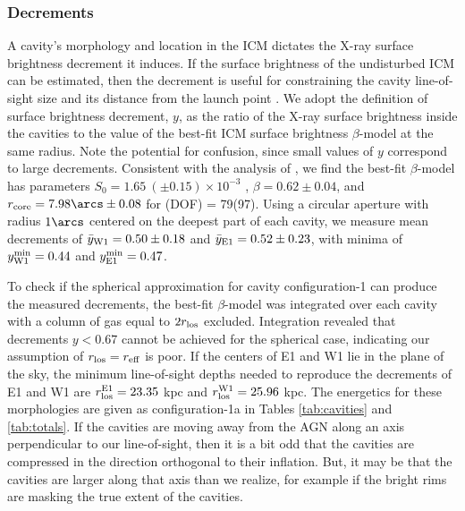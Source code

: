 \documentclass[11pt, preprint]{aastex}
\begin{document}
\subsubsection{Decrements}
\label{sec:dec}

A cavity's morphology and location in the ICM dictates the X-ray
surface brightness decrement it induces. If the surface brightness of
the undisturbed ICM can be estimated, then the decrement is useful for
constraining the cavity line-of-sight size and its distance from the
launch point \citep[\ie\ \rlos\ and $z$, respectively; see][for
  details]{hydraa}. We adopt the \citet{hydraa} definition of surface
brightness decrement, $y$, as the ratio of the X-ray surface
brightness inside the cavities to the value of the best-fit ICM
surface brightness $\beta$-model at the same radius. Note the
potential for confusion, since small values of $y$ correspond to large
decrements. Consistent with the analysis of \citet{schindler01}, we
find the best-fit $\beta$-model has parameters $S_0 = 1.65 ~(\pm 0.15)
\times 10^{-3}$ \sbr, $\beta = 0.62 \pm 0.04$, and $r_{\rm{core}} =
7.98\arcs \pm 0.08$ for \chisq(DOF) = 79(97). Using a circular
aperture with radius $1\arcs$ centered on the deepest part of each
cavity, we measure mean decrements of $\bar{y}_{\rm{W1}} = 0.50 \pm
0.18$ and $\bar{y}_{\rm{E1}} = 0.52 \pm 0.23$, with minima of
$y^{\rm{min}}_{\rm{W1}} = 0.44$ and $y^{\rm{min}}_{\rm{E1}} = 0.47$.

To check if the spherical approximation for cavity configuration-1 can
produce the measured decrements, the best-fit $\beta$-model was
integrated over each cavity with a column of gas equal to $2r_{\rm{los}}$
excluded. Integration revealed that decrements $y < 0.67$ cannot be
achieved for the spherical case, indicating our assumption of $r_{\rm{los}} =
r_{\rm{eff}}$ is poor. If the centers of E1 and W1 lie in the plane of the
sky, the minimum line-of-sight depths needed to reproduce the
decrements of E1 and W1 are $r_{\rm{los}}^{\rm{E1}} = 23.35$ kpc and
$r_{\rm{los}}^{\rm{W1}} = 25.96$ kpc. The energetics for these morphologies
are given as configuration-1a in Tables \ref{tab:cavities} and
\ref{tab:totals}. If the cavities are moving away from the AGN along
an axis perpendicular to our line-of-sight, then it is a bit odd that
the cavities are compressed in the direction orthogonal to their
inflation. But, it may be that the cavities are larger along that axis
than we realize, for example if the bright rims are masking the true
extent of the cavities.
\end{document}
